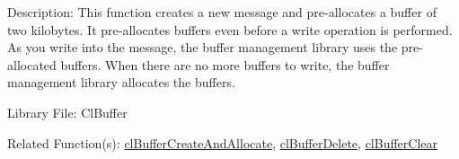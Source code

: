 \begin{Desc}
\item[Description:]This function creates a new message and pre-allocates a buffer of two kilobytes. It pre-allocates buffers even before a write 
operation is performed. As you write into the message, the buffer management library uses the pre-allocated buffers. When there are no more buffers 
to write, the buffer management library allocates the buffers.\end{Desc}
\begin{Desc}
\item[Library File:]Cl\-Buffer\end{Desc}
\begin{Desc}
\item[Related Function(s):]\hyperlink{pagebuf104}{cl\-Buffer\-Create\-And\-Allocate}, \hyperlink{pagebuf105}{cl\-Buffer\-Delete}, 
\hyperlink{pagebuf106}{cl\-Buffer\-Clear} \end{Desc}


\newpage
